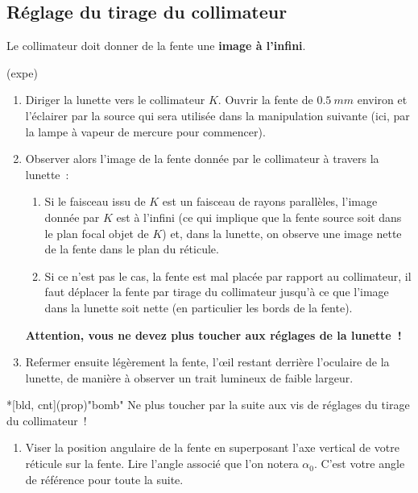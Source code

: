 \documentclass[../main/main.tex]{subfiles}
\begin{document}
\subsection{Réglage du tirage du collimateur}

Le collimateur doit donner de la fente une \textbf{image à l'infini}.
\begin{tcb}(expe){}
  \begin{enumerate}
    \item Diriger la lunette vers le collimateur $K$. Ouvrir la fente de
      $\SI{0,5}{mm}$ environ et l'éclairer par la source qui sera utilisée dans
      la manipulation suivante (ici, par la lampe à vapeur de mercure pour
      commencer).
    \item Observer alors l'image de la fente donnée par le collimateur à travers
      la lunette~:
    \begin{enumerate}
      \item Si le faisceau issu de $K$ est un faisceau de rayons parallèles,
    l'image donnée par $K$ est à l'infini (ce qui implique que la fente source
    soit dans le plan focal objet de $K$) et, dans la lunette, on observe une
    image nette de la fente dans le plan du réticule.
      \item Si ce n'est pas le cas, la fente est mal
    placée par rapport au collimateur, il faut déplacer la fente par tirage du
    collimateur jusqu'à ce que l'image dans la lunette soit nette (en
    particulier les bords de la fente).
    \end{enumerate}
    \begin{center}
      \bfseries
      Attention, vous ne devez plus toucher aux réglages de la lunette~! 
    \end{center}
    \item Refermer ensuite légèrement la fente, l'œil restant derrière l'oculaire
      de la lunette, de manière à observer un trait lumineux de faible largeur.
  \end{enumerate}
  \begin{tcb}*[bld, cnt](prop)"bomb"{}
    Ne plus toucher par la suite aux vis de réglages du tirage du collimateur~!
  \end{tcb}
  \begin{enumerate}[resume]
    \item Viser la position angulaire de la fente en superposant l'axe vertical
      de votre réticule sur la fente. Lire l'angle associé que l'on notera
      $\alpha_0$. C'est votre angle de référence pour toute la suite.
  \end{enumerate}
\end{tcb}
\end{document}
